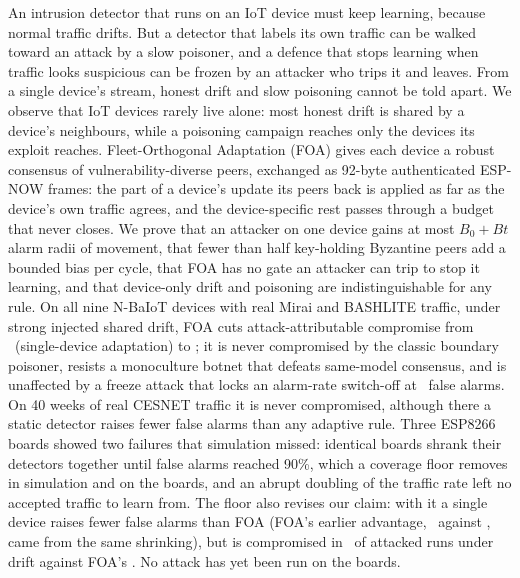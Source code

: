 An intrusion detector that runs on an IoT device must keep learning, because normal traffic drifts. But
a detector that labels its own traffic can be walked toward an attack by a slow poisoner, and a defence
that stops learning when traffic looks suspicious can be frozen by an attacker who trips it and leaves.
From a single device's stream, honest drift and slow poisoning cannot be told apart. We observe that IoT
devices rarely live alone: most honest drift is shared by a device's neighbours, while a poisoning
campaign reaches only the devices its exploit reaches. Fleet-Orthogonal Adaptation (FOA) gives each
device a robust consensus of vulnerability-diverse peers, exchanged as 92-byte authenticated ESP-NOW
frames: the part of a device's update its peers back is applied as far as the device's own traffic agrees,
and the device-specific rest passes through a budget that never closes. We prove that an attacker on one device gains at most
$B_0+Bt$ alarm radii of movement, that fewer than half key-holding Byzantine peers add a bounded bias per
cycle, that FOA has no gate an attacker can trip to stop it learning, and that device-only drift and poisoning are indistinguishable for any rule.
On all nine N-BaIoT devices with real Mirai and BASHLITE traffic, under strong injected shared drift,
FOA cuts attack-attributable compromise from \AutoComp\ (single-device adaptation) to \FOAComp; it is never
compromised by the classic boundary poisoner, resists a monoculture botnet that defeats same-model
consensus, and is unaffected by a freeze attack that locks an alarm-rate switch-off at
\KLFrozenFPR\ false alarms. On 40 weeks of real CESNET traffic it is never compromised, although
there a static detector raises fewer false alarms than any adaptive rule. Three ESP8266 boards showed
two failures that simulation missed: identical boards shrank their detectors together until false
alarms reached 90\%, which a coverage floor removes in simulation and on the boards, and an abrupt
doubling of the traffic rate left no accepted traffic to learn from. The floor also revises our claim:
with it a single device raises fewer false alarms than FOA (FOA's earlier advantage, \FOAFleetFPR\
against \AutoFleetFPR, came from the same shrinking), but is compromised in \FlAutoFCompStrong\ of
attacked runs under drift against FOA's \FlFOAFCompStrong. No attack has yet been run on the boards.
